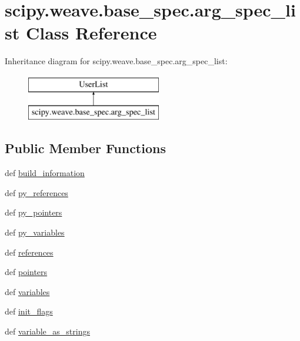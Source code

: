 \hypertarget{classscipy_1_1weave_1_1base__spec_1_1arg__spec__list}{}\section{scipy.\+weave.\+base\+\_\+spec.\+arg\+\_\+spec\+\_\+list Class Reference}
\label{classscipy_1_1weave_1_1base__spec_1_1arg__spec__list}
Inheritance diagram for scipy.\+weave.\+base\+\_\+spec.\+arg\+\_\+spec\+\_\+list\+:\begin{figure}[H]
\begin{center}
\leavevmode
\includegraphics[height=2.000000cm]{classscipy_1_1weave_1_1base__spec_1_1arg__spec__list}
\end{center}
\end{figure}
\subsection*{Public Member Functions}
\begin{DoxyCompactItemize}
\item 
def \hyperlink{classscipy_1_1weave_1_1base__spec_1_1arg__spec__list_a56c8bd8a2b74c995be8084e97a651334}{build\+\_\+information}
\item 
def \hyperlink{classscipy_1_1weave_1_1base__spec_1_1arg__spec__list_a27860c292c10da8ce2d18360a68fda50}{py\+\_\+references}
\item 
def \hyperlink{classscipy_1_1weave_1_1base__spec_1_1arg__spec__list_ae5e443f651b0a0fadf80949ab2e556da}{py\+\_\+pointers}
\item 
def \hyperlink{classscipy_1_1weave_1_1base__spec_1_1arg__spec__list_a3dafaa5421caeb0be8dea0ffcdc16d44}{py\+\_\+variables}
\item 
def \hyperlink{classscipy_1_1weave_1_1base__spec_1_1arg__spec__list_a7b8f982b400fd31a33d7bb545818d8d9}{references}
\item 
def \hyperlink{classscipy_1_1weave_1_1base__spec_1_1arg__spec__list_a511563d95b2e2ab7383a6a3ce44dc774}{pointers}
\item 
def \hyperlink{classscipy_1_1weave_1_1base__spec_1_1arg__spec__list_a9383d2d0a747a3a362adfd0e86d42aa7}{variables}
\item 
def \hyperlink{classscipy_1_1weave_1_1base__spec_1_1arg__spec__list_a6a8263a3f3012897892f4897f35cafa2}{init\+\_\+flags}
\item 
def \hyperlink{classscipy_1_1weave_1_1base__spec_1_1arg__spec__list_a17b18a8888ecde261bf8a74f41f84e77}{variable\+\_\+as\+\_\+strings}
\end{DoxyCompactItemize}


